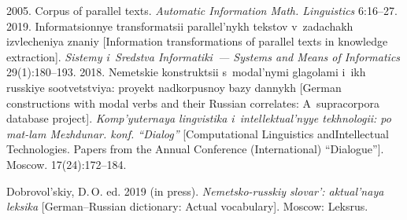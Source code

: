   \begin{multicols}{2}

\renewcommand{\bibname}{\protect\rmfamily References}

{\small\frenchspacing
 {%
 \begin{thebibliography}{99}
 
 
 
 2005. 
Corpus of parallel texts. \textit{Automatic Information Math. Linguistics} 6:16--27.
 2019. In\-for\-ma\-tsi\-on\-nye transformatsii 
parallel'nykh tekstov v~zadachakh izvlecheniya znaniy [Information transformations of parallel 
texts in knowledge extraction]. \textit{Sistemy i~Sredstva Informatiki~--- Systems and Means of 
Informatics} 29(1):180--193.
 2018. Ne\-mets\-kie konstruktsii 
s~modal'nymi glagolami i~ikh russkiye sootvetstviya: proyekt nadkorpusnoy bazy dannykh 
[German constructions with modal verbs and their Russian correlates: A~supracorpora database 
project]. \textit{Komp'yuternaya lingvistika i~intellektual'nyye tekhnologii: po mat-lam 
Mezhdunar. konf. ``Dialog''} [Computational Linguistics and\linebreak Intellectual Technologies. Papers 
from the Annual Conference (International) ``Dialogue'']. Moscow. 17(24):172--184.


Dobrovol'skiy, D.\,O. ed. 2019 (in press). \textit{Nemetsko-russkiy slovar': aktual'naya 
leksika} [German--Russian dictionary: Actual vocabulary]. Moscow: Leksrus.



\end{thebibliography}}}
\end{multicols}
